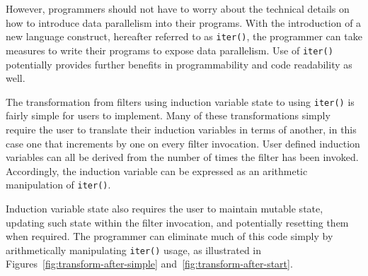 %  
%
%
%
%
%
%    
%
%



However, programmers should not have to worry about the technical details on how to introduce data parallelism into their programs.  With the introduction of a new language construct, hereafter referred to as {\tt iter()}, the programmer can take measures to write their programs to expose data parallelism.  Use of {\tt iter()} potentially provides further benefits in programmability and code readability as well.

The transformation from filters using induction variable state to using {\tt iter()} is fairly simple for users to implement.  Many of these transformations simply require the user to translate their induction variables in terms of another, in this case one that increments by one on every filter invocation.  User defined induction variables can all be derived from the number of times the filter has been invoked.  Accordingly, the induction variable can be expressed as an arithmetic manipulation of {\tt iter()}.  

Induction variable state also requires the user to maintain mutable state, updating such state within the filter invocation, and potentially resetting them when required. The programmer can eliminate much of this code simply by arithmetically manipulating {\tt iter()} usage, as illustrated in Figures~\ref{fig:transform-after-simple} and~\ref{fig:transform-after-start}.

